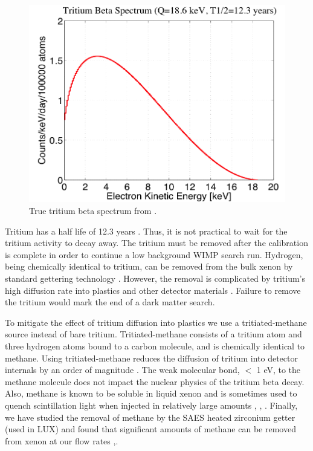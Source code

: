\begin{figure}[h!]\centering
\includegraphics[width=120mm]{Tritium_Source/Tritium_Spectrum.png}
\caption{True tritium beta spectrum from \cite{Tritium_Eq}. }
\label{fig:True_T_Spec}
\end{figure}


Tritium has a half life of 12.3 years \cite{Tritium_halflife_all}. Thus, it is not practical to wait for the tritium activity to decay away. The tritium must be removed after the calibration is complete in order to continue a low background WIMP search run. Hydrogen, being chemically identical to tritium, can be removed from the bulk xenon by standard gettering technology \cite{SAES}. However, the removal is complicated by tritium's high diffusion rate into plastics and other detector materials \cite{miyake:1983}. Failure to remove the tritium would mark the end of a dark matter search. 

To mitigate the effect of tritium diffusion into plastics we use a tritiated-methane source instead of bare tritium. Tritiated-methane consists of a tritium atom and three hydrogen atoms bound to a carbon molecule, and is chemically identical to methane. Using tritiated-methane reduces the diffusion of tritium into detector internals by an order of magnitude \cite{miyake:1983}. The weak molecular bond,  $<$ 1 eV, to the methane molecule does not impact the nuclear physics of the tritium beta decay. Also, methane is known to be soluble in liquid xenon and is sometimes used to quench scintillation light when injected in relatively large amounts \cite{bondar2006two}, \cite{Kirill_Methane}, \cite{Shibamura}. Finally, we have studied the removal of methane by the SAES heated zirconium getter (used in LUX) and found that significant amounts of methane can be removed from xenon at our flow rates \cite{Dobi_CH4},\cite{coldtrap}. 


